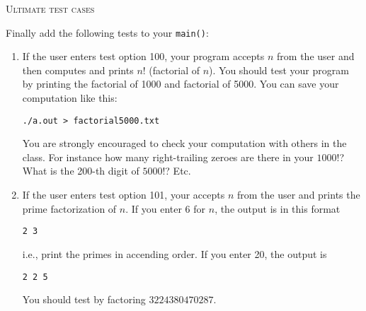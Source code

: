 \textsc{Ultimate test cases}

Finally add the following tests to your \verb!main()!:
\begin{enumerate}[nosep]
\item If the user enters test option 100,
your program accepts $n$ from the
user and then computes and prints $n!$ (factorial of $n$).
You should test your program by printing the factorial of 1000 and
factorial of 5000.
You can save your computation like this:
\begin{Verbatim}[frame=single,fontsize=\footnotesize]
./a.out > factorial5000.txt
\end{Verbatim}
You are strongly encouraged to check your computation with others in the
class. For instance how many right-trailing zeroes are there in your
$1000!$? What is the 200-th digit of $5000!$? Etc. 
\item If the user enters test option 101,
your accepts $n$ from the
user and prints the prime factorization of $n$.
If you enter $6$ for $n$, the output is in this format
\begin{Verbatim}[frame=single,fontsize=\footnotesize]
2 3
\end{Verbatim}
i.e., print the primes in accending order.
If you enter 20, the output is
\begin{Verbatim}[frame=single,fontsize=\footnotesize]
2 2 5
\end{Verbatim}
You should test by factoring $3224380470287$.
\end{enumerate}
